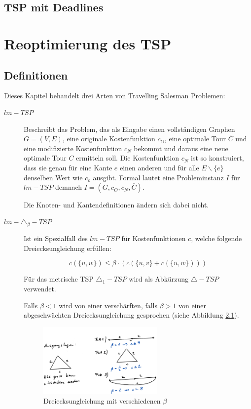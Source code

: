 \documentclass[a4paper,11pt]{scrreprt}
\begin{document}
\section{TSP mit Deadlines}

\chapter{Reoptimierung des TSP}

\section{Definitionen}

Dieses Kapitel behandelt drei Arten von Travelling Salesman Problemen:

\begin{description}
\item[$lm-TSP$] 
Beschreibt das Problem, das als Eingabe einen vollständigen Graphen $G = (V, E)$, eine originale Kostenfunktion $c_O$, eine optimale Tour $\overline{C}$ und eine modifizierte Kostenfunktion $c_N$ bekommt und daraus eine neue optimale Tour $C$ ermitteln soll. Die Kostenfunktion $c_N$ ist so konstruiert, dass sie genau für eine Kante $e$ einen anderen und für alle $E \backslash \{e\}$ denselben Wert wie $c_o$ ausgibt. Formal lautet eine Probleminstanz $I$ für $lm-TSP$ demnach $I = (G, c_O, c_N, \overline{C})$.
			    
Die Knoten- und Kantendefinitionen ändern sich dabei nicht.

\item[$lm-\triangle_\beta-TSP$]
Ist ein Spezialfall des $lm-TSP$ für Kostenfunktionen $c$, welche folgende Dreiecksungleichung erfüllen:

\[ c(\{u,w\}) \le \beta \cdot (c(\{u,v\} + c(\{u,w\}))) \]

Für das metrische TSP $\triangle_1-TSP$ wird als Abkürzung $\triangle-TSP$ verwendet.

Falls $\beta < 1$ wird von einer verschärften, falls $\beta > 1$ von einer abgeschwächten Dreiecksungleichung gesprochen (siehe Abbildung \ref{fig:triangle-inequality-beta}).

\begin{figure}[H]
\centering
\includegraphics[width=0.6\textwidth]{triangle_inequality_beta.png}
\caption{Dreiecksungleichung mit verschiedenen $\beta$}
\label{fig:triangle-inequality-beta}
\end{figure}


\end{description}
\end{document}
